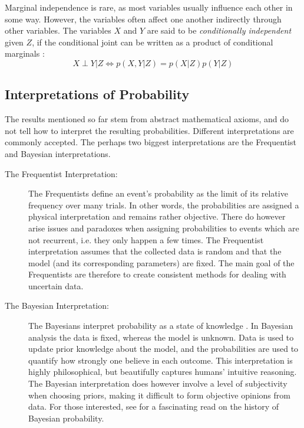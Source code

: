Marginal independence is rare, as most variables usually influence each other in some way. However, the variables often affect one another indirectly through other variables. The variables $X$ and $Y$ are said to be \textit{conditionally independent} given $Z$, if the conditional joint can be written as a product of conditional marginals \cite[p.~31]{murphy}:
\begin{equation}\label{eq:conditional_independence}
    X \perp Y | Z \iff p(X, Y | Z) = p(X | Z)p(Y | Z)
\end{equation}

\subsection{Interpretations of Probability}
The results mentioned so far stem from abstract mathematical axioms, and do not tell how to interpret the resulting probabilities. Different interpretations are commonly accepted. The perhaps two biggest interpretations are the Frequentist and Bayesian interpretations. 

\begin{description}
    \item[The Frequentist Interpretation:] The Frequentists define an event's probability as the limit of its relative frequency over many trials. In other words, the probabilities are assigned a physical interpretation and remains rather objective. There do however arise issues and paradoxes when assigning probabilities to events which are not recurrent, i.e. they only happen a few times. The Frequentist interpretation assumes that the collected data is random and that the model (and its corresponding parameters) are fixed. The main goal of the Frequentists are therefore to create consistent methods for dealing with uncertain data.
    \item[The Bayesian Interpretation:] The Bayesians interpret probability as a state of knowledge \cite{Jaynes86bayesianmethods:}. In Bayesian analysis the data is fixed, whereas the model is unknown. Data is used to update prior knowledge about the model, and the probabilities are used to quantify how strongly one believe in each outcome. This interpretation is highly philosophical, but beautifully captures humans' intuitive reasoning. The Bayesian interpretation does however involve a level of subjectivity when choosing priors, making it difficult to form objective opinions from data. For those interested, see \Cite{Jaynes86bayesianmethods:} for a fascinating read on the history of Bayesian probability.
\end{description}

